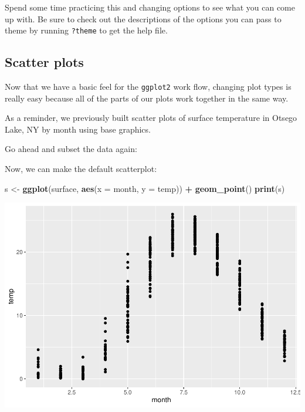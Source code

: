 \documentclass[
]{book}
\newenvironment{Shaded}{\begin{snugshade}}{\end{snugshade}}
\newcommand{\DataTypeTok}[1]{\textcolor[rgb]{0.13,0.29,0.53}{#1}}
\newcommand{\FloatTok}[1]{\textcolor[rgb]{0.00,0.00,0.81}{#1}}
\newcommand{\KeywordTok}[1]{\textcolor[rgb]{0.13,0.29,0.53}{\textbf{#1}}}
\newcommand{\NormalTok}[1]{#1}
\newcommand{\OperatorTok}[1]{\textcolor[rgb]{0.81,0.36,0.00}{\textbf{#1}}}
\newcommand{\StringTok}[1]{\textcolor[rgb]{0.31,0.60,0.02}{#1}}
\begin{document}
Spend some time practicing this and changing options to see what you can come up with. Be sure to check out the descriptions of the options you can pass to theme by running \texttt{?theme} to get the help file.

\hypertarget{ggscatter}{%
\subsection{Scatter plots}\label{ggscatter}}

Now that we have a basic feel for the \texttt{ggplot2} work flow, changing plot types is really easy because all of the parts of our plots work together in the same way.

As a reminder, we previously built scatter plots of surface temperature in Otsego Lake, NY by month using base graphics.

Go ahead and subset the data again:

\begin{Shaded}
\end{Shaded}

Now, we can make the default scatterplot:

\begin{Shaded}
\begin{Highlighting}[]
\NormalTok{s <-}\StringTok{ }\KeywordTok{ggplot}\NormalTok{(surface, }\KeywordTok{aes}\NormalTok{(}\DataTypeTok{x =}\NormalTok{ month, }\DataTypeTok{y =}\NormalTok{ temp)) }\OperatorTok{+}
\StringTok{  }\KeywordTok{geom_point}\NormalTok{()}
\KeywordTok{print}\NormalTok{(s)}
\end{Highlighting}
\end{Shaded}

\includegraphics{worstr_files/figure-latex/unnamed-chunk-103-1.pdf}
\end{document}
